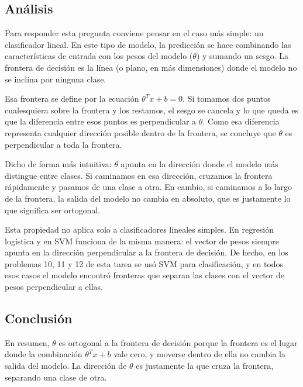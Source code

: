 \documentclass{article}
\begin{document}
\subsection{Análisis}

Para responder esta pregunta conviene pensar en el caso más simple: un clasificador lineal. En este tipo de modelo, la predicción se hace combinando las características de entrada con los pesos del modelo ($\theta$) y sumando un sesgo. La frontera de decisión es la línea (o plano, en más dimensiones) donde el modelo no se inclina por ninguna clase.

Esa frontera se define por la ecuación $\theta^T x + b = 0$. Si tomamos dos puntos cualesquiera sobre la frontera y los restamos, el sesgo se cancela y lo que queda es que la diferencia entre esos puntos es perpendicular a $\theta$. Como esa diferencia representa cualquier dirección posible dentro de la frontera, se concluye que $\theta$ es perpendicular a toda la frontera.

Dicho de forma más intuitiva: $\theta$ apunta en la dirección donde el modelo más distingue entre clases. Si caminamos en esa dirección, cruzamos la frontera rápidamente y pasamos de una clase a otra. En cambio, si caminamos a lo largo de la frontera, la salida del modelo no cambia en absoluto, que es justamente lo que significa ser ortogonal.

Esta propiedad no aplica solo a clasificadores lineales simples. En regresión logística y en SVM funciona de la misma manera: el vector de pesos siempre apunta en la dirección perpendicular a la frontera de decisión. De hecho, en los problemas 10, 11 y 12 de esta tarea se usó SVM para clasificación, y en todos esos casos el modelo encontró fronteras que separan las clases con el vector de pesos perpendicular a ellas.

\subsection{Conclusión}

En resumen, $\theta$ es ortogonal a la frontera de decisión porque la frontera es el lugar donde la combinación $\theta^T x + b$ vale cero, y moverse dentro de ella no cambia la salida del modelo. La dirección de $\theta$ es justamente la que cruza la frontera, separando una clase de otra.



\end{document}
